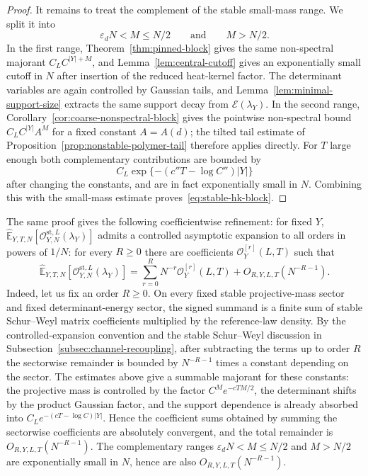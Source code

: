 \documentclass[11pt,a4paper,reqno]{amsart}
\theoremstyle{definition}
\theoremstyle{remark}
\newcommand\E{{\mathbb E}}
\begin{document}
\begin{proof}
It remains to treat the complement of the stable small-mass range.  We split it into
\[
\varepsilon_dN<M\le N/2
\qquad\text{and}\qquad
M>N/2.
\]
In the first range, Theorem~\ref{thm:pinned-block} gives the same non-spectral majorant $C_LC^{|Y|+M}$, and Lemma~\ref{lem:central-cutoff} gives an exponentially small cutoff in $N$ after insertion of the reduced heat-kernel factor.  The determinant variables are again controlled by Gaussian tails, and Lemma~\ref{lem:minimal-support-size} extracts the same support decay from $\mathcal E(\lambda_Y)$.  In the second range, Corollary~\ref{cor:coarse-nonspectral-block} gives the pointwise non-spectral bound
$C_LC^{|Y|}A^{M}$ for a fixed constant $A=A(d)$; the tilted tail estimate of Proposition~\ref{prop:nonstable-polymer-tail} therefore applies directly.  For $T$ large enough both complementary contributions are bounded by
\[
C_L\exp\{-(c''T-\log C'')|Y|\}
\]
after changing the constants, and are in fact exponentially small in $N$.  Combining this with the small-mass estimate proves~\eqref{eq:stable-hk-block}.
\end{proof}

The same proof gives the following coefficientwise refinement: for fixed $Y$, $\widehat\E_{Y,T,N}\left[\mathcal O_{Y,N}^{\mathrm{st},L}(\lambda_Y)\right]$ admits a controlled asymptotic expansion to all orders in powers of $1/N$: for every $R\ge0$ there are coefficients $\mathcal O_Y^{[r]}(L,T)$ such that
\begin{equation}\label{eq:stable-hk-block-expansion}
\widehat\E_{Y,T,N}\left[\mathcal O_{Y,N}^{\mathrm{st},L}(\lambda_Y)\right]=\sum_{r=0}^{R}N^{-r}\mathcal O_Y^{[r]}(L,T)+O_{R,Y,L,T}(N^{-R-1}).
\end{equation}
Indeed, let us fix an order $R\ge0$.  On every fixed stable projective-mass sector and fixed determinant-energy sector, the signed summand is a finite sum of stable Schur--Weyl matrix coefficients multiplied by the reference-law density.  By the controlled-expansion convention and the stable Schur--Weyl discussion in Subsection~\ref{subsec:channel-recoupling}, after subtracting the terms up to order $R$ the sectorwise remainder is bounded by $N^{-R-1}$ times a constant depending on the sector.  The estimates above give a summable majorant for these constants: the projective mass is controlled by the factor $C^M e^{-cTM/2}$, the determinant shifts by the product Gaussian factor, and the support dependence is already absorbed into $C_L e^{-(cT-\log C)|Y|}$.  Hence the coefficient sums obtained by summing the sectorwise coefficients are absolutely convergent, and the total remainder is $O_{R,Y,L,T}(N^{-R-1})$.  The complementary ranges $\varepsilon_dN<M\le N/2$ and $M>N/2$ are exponentially small in $N$, hence are also $O_{R,Y,L,T}(N^{-R-1})$.
\end{document}
